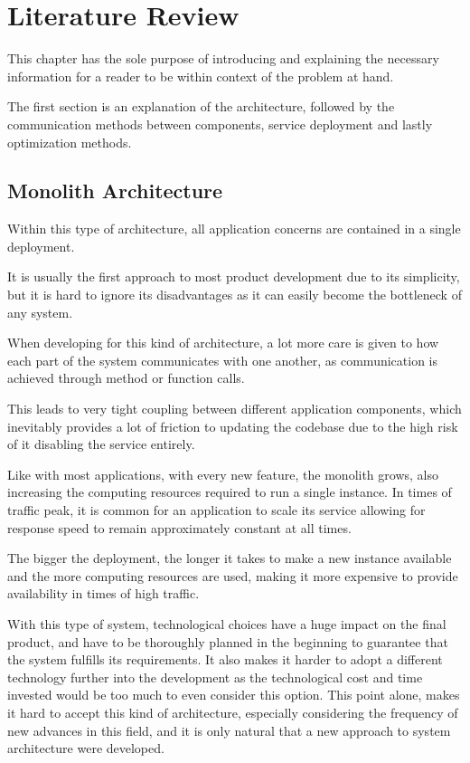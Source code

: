 \chapter{Literature Review} \label{chap:literature review}

This chapter has the sole purpose of introducing and explaining the necessary information for a reader to be within context of the problem at hand.

The first section is an explanation of the architecture, followed by the communication methods between components, service deployment and lastly optimization methods.

\section{Monolith Architecture}

Within this type of architecture, all application concerns are contained in a single deployment.

It is usually the first approach to most product development due to its simplicity, but it is hard to ignore its disadvantages as it can easily become the bottleneck of any system.

When developing for this kind of architecture, a lot more care is given to how each part of the system communicates with one another, as communication is achieved through method or function calls. 

This leads to very tight coupling between different application components, which inevitably provides a lot of friction to updating the codebase due to the high risk of it disabling the service entirely.

Like with most applications, with every new feature, the monolith grows, also increasing the computing resources required to run a single instance. In times of traffic peak, it is common for an application to scale its service allowing for response speed to remain approximately constant at all times. 

The bigger the deployment, the longer it takes to make a new instance available and the more computing resources are used, making it more expensive to provide availability in times of high traffic.

With this type of system, technological choices have a huge impact on the final product, and have to be thoroughly planned in the beginning to guarantee that the system fulfills its requirements. It also makes it harder to adopt a different technology further into the development as the technological cost and time invested would be too much to even consider this option. This point alone, makes it hard to accept this kind of architecture, especially considering the frequency of new advances in this field, and it is only natural that a new approach to system architecture were developed.

